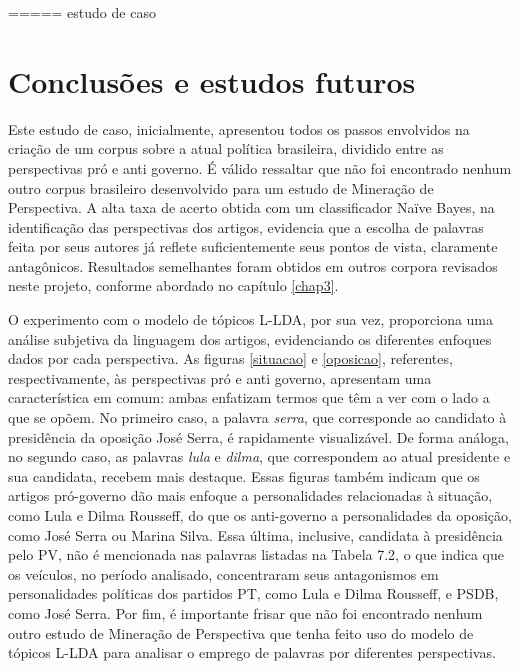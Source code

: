===== estudo de caso

\section{Conclusões e estudos futuros}
\label{estudo:sec4}

Este estudo de caso, inicialmente, apresentou todos os passos envolvidos na criação de um corpus sobre a atual política brasileira, dividido entre as perspectivas pró e anti governo. É válido ressaltar que não foi encontrado nenhum outro corpus brasileiro desenvolvido para um estudo de Mineração de Perspectiva. A alta taxa de acerto obtida com um classificador Naïve Bayes, na identificação das perspectivas dos artigos, evidencia que a escolha de palavras feita por seus autores já reflete suficientemente seus pontos de vista, claramente antagônicos. Resultados semelhantes foram obtidos em outros corpora revisados neste projeto, conforme abordado no capítulo \ref{chap3}. %



O experimento com o modelo de tópicos L-LDA, por sua vez, proporciona uma análise subjetiva da linguagem dos artigos, evidenciando os diferentes enfoques dados por cada perspectiva. As figuras \ref{situacao} e \ref{oposicao}, referentes, respectivamente, às perspectivas pró e anti governo, apresentam uma característica em comum: ambas enfatizam termos que têm a ver com o lado a que se opõem. No primeiro caso, a palavra \emph{serra}, que corresponde ao candidato à presidência da oposição José Serra, é rapidamente visualizável. De forma análoga, no segundo caso, as palavras \emph{lula} e \emph{dilma}, que correspondem ao atual presidente e sua candidata, recebem mais destaque. Essas figuras também indicam que os artigos pró-governo dão mais enfoque a personalidades relacionadas à situação, como Lula e Dilma Rousseff, do que os anti-governo a personalidades da oposição, como José Serra ou Marina Silva. Essa última, inclusive, candidata à presidência pelo PV, não é mencionada nas palavras listadas na Tabela 7.2, o que indica que os veículos, no período analisado, concentraram seus antagonismos em personalidades políticas dos partidos PT, como Lula e Dilma Rousseff, e PSDB, como José Serra. Por fim, é importante frisar que não foi encontrado nenhum outro estudo de Mineração de Perspectiva que tenha feito uso do modelo de tópicos L-LDA para analisar o emprego de palavras por diferentes perspectivas.

